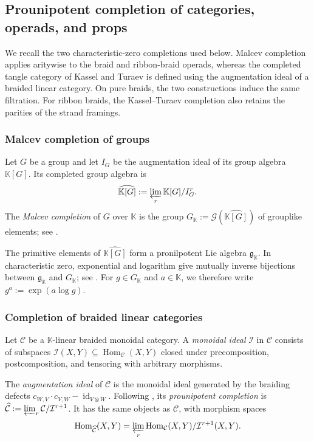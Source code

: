 \documentclass{amsart}
\newcommand{\calC}{\mathcal{C}}
\newcommand{\kk}{\mathbb{K}}    %
\newcommand{\id}{\operatorname{id}}
\newcommand{\Hom}{\operatorname{Hom}}
\theoremstyle{definition}
\numberwithin{equation}{section}
\begin{document}
\subsection{Prounipotent completion of categories, operads, and props}
\label{sec: completion of categories, operads and props}

We recall the two characteristic-zero completions used below. Malcev
completion applies aritywise to the braid and ribbon-braid operads,
whereas the completed tangle category of Kassel and Turaev is defined
using the augmentation ideal of a braided linear category. On pure
braids, the two constructions induce the same filtration. For ribbon
braids, the Kassel--Turaev completion also retains the parities of the
strand framings.

\subsubsection{Malcev completion of groups}

Let $G$ be a group and let $I_G$ be the augmentation ideal of its group algebra $\kk[G]$. Its completed group algebra is
\[\widehat{\kk[G]}:=\varprojlim_r\kk[G]/I_G^r.\] The \emph{Malcev completion} of $G$ over $\kk$ is the group $G_{\kk}:=\mathcal G(\widehat{\kk[G]})$ of grouplike elements; see \cite[Chapter~8]{FresseBook1}.

The primitive elements of $\widehat{\kk[G]}$ form a pronilpotent Lie algebra $\mathfrak g_{\kk}$. In characteristic zero, exponential and logarithm give mutually inverse bijections between $\mathfrak g_{\kk}$ and $G_{\kk}$; see \cite[Proposition~8.1.5]{FresseBook1}. For $g\in G_{\kk}$ and $a\in\kk$, we therefore write $g^a:=\exp(a\log g)$.

\subsubsection{Completion of braided linear categories}

Let $\calC$ be a $\kk$-linear braided monoidal category.
A \emph{monoidal ideal} $\mathcal I$ in $\calC$ consists of
subspaces $\mathcal I(X,Y)\subseteq\Hom_{\calC}(X,Y)$ closed
under precomposition, postcomposition, and tensoring with
arbitrary morphisms.

The \emph{augmentation ideal} of $\calC$ is the monoidal
ideal generated by the braiding defects
$c_{W,V}\cdot c_{V,W}-\id_{V\otimes W}$.
Following \cite[Section~3.4]{KT_Tangles}, its
\emph{prounipotent completion} is
$\widehat{\calC}:=\varprojlim_r\calC/\mathcal I^{r+1}$.
It has the same objects as $\calC$, with morphism spaces
\[
\Hom_{\widehat{\calC}}(X,Y)
=
\varprojlim_r
\Hom_{\calC}(X,Y)/\mathcal I^{r+1}(X,Y).
\]
\end{document}
